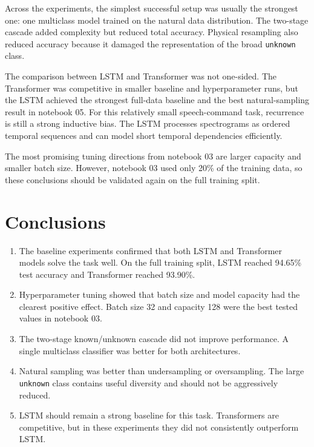 \documentclass[14pt]{article}
\begin{document}
Across the experiments, the simplest successful setup was usually the strongest one: one multiclass model trained on the natural data distribution. The two-stage cascade added complexity but reduced total accuracy. Physical resampling also reduced accuracy because it damaged the representation of the broad \texttt{unknown} class.

The comparison between LSTM and Transformer was not one-sided. The Transformer was competitive in smaller baseline and hyperparameter runs, but the LSTM achieved the strongest full-data baseline and the best natural-sampling result in notebook 05. For this relatively small speech-command task, recurrence is still a strong inductive bias. The LSTM processes spectrograms as ordered temporal sequences and can model short temporal dependencies efficiently.

The most promising tuning directions from notebook 03 are larger capacity and smaller batch size. However, notebook 03 used only 20\% of the training data, so these conclusions should be validated again on the full training split.

\section{Conclusions}

\begin{enumerate}
    \item The baseline experiments confirmed that both LSTM and Transformer models solve the task well. On the full training split, LSTM reached 94.65\% test accuracy and Transformer reached 93.90\%.
    \item Hyperparameter tuning showed that batch size and model capacity had the clearest positive effect. Batch size 32 and capacity 128 were the best tested values in notebook 03.
    \item The two-stage known/unknown cascade did not improve performance. A single multiclass classifier was better for both architectures.
    \item Natural sampling was better than undersampling or oversampling. The large \texttt{unknown} class contains useful diversity and should not be aggressively reduced.
    \item LSTM should remain a strong baseline for this task. Transformers are competitive, but in these experiments they did not consistently outperform LSTM.
\end{enumerate}
\end{document}
